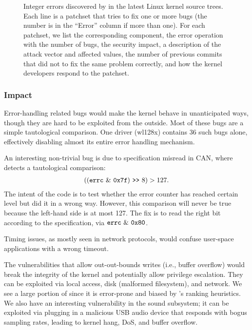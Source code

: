 \begin{figure*}
\centering
\footnotesize

\caption{Integer errors discovered by \sys in the latest Linux
kernel source trees.  Each line is a patchset that tries to fix one
or more bugs (the number is in the ``Error'' column if more than
one).  For each patchset, we list the corresponding component, the
error operation with the number of bugs, the security impact, a
description of the attack vector and affected values, the number
of previous commits that did not to fix the same problem correctly,
and how the kernel developers respond to the patchset.}
\label{f:data:linux}
\end{figure*}

\subsubsection{Impact}

Error-handling related bugs would make the kernel behave in
unanticipated ways, though they are hard to be exploited from the
outside.  Most of these bugs are a simple tautological comparison.
One driver (wl128x) contains 36 such bugs alone, effectively disabling
almost its entire error handling mechanism.

An interesting non-trivial bug is due to specification misread in
CAN, where \sys detects a tautological comparison:
\begin{align*}
((\texttt{errc}\ \&\ \texttt{0x7f}) \ \texttt{>}\texttt{>}\  8) > 127.
\end{align*}
The intent of the code is to test whether the error counter has
reached certain level but did it in a wrong way.  However, this
comparison will never be true because the left-hand side is at most
127.  The fix is to read the right bit according to the specification,
via $\cc{errc}\ \&\ \cc{0x80}$.

Timing issues, as mostly seen in network protocols, would confuse
user-space applications with a wrong timeout.

The vulnerabilities that allow out-out-bounds writes (i.e., buffer
overflow) would break the integrity of the kernel and potentially
allow privilege escalation.  They can be exploited via local access,
disk (malformed filesystem), and network.  We see a large portion
of  since it is error-prone and biased by \sys's ranking
heuristics.  We also have an interesting vulnerability in the sound
subsystem; it can be exploited via plugging in a malicious USB audio
device that responds with bogus sampling rates, leading to kernel
hang, DoS, and buffer overflow.

